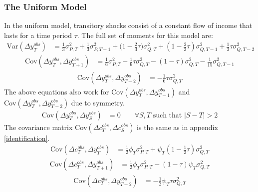 \subsubsection{The Uniform Model}
In the uniform model, transitory shocks consist of a constant flow of income that lasts for a time period $\tau$. The full set of moments for this model are:
\begin{align}
\mathrm{Var}(\Delta y^{obs}_T) &= \frac{1}{3}\sigma^2_{P,T} + \frac{1}{3}\sigma^2_{P,T-1} + \big(1-\frac{2}{3}\tau\big) \sigma^2_{Q,T}   +(1-\frac{2}{3}\tau) \sigma^2_{Q,T-1} + \frac{1}{3} \tau\sigma^2_{Q,T-2}
\end{align}
\begin{align}
\mathrm{Cov}(\Delta y^{obs}_T, \Delta y^{obs}_{T+1}) &= \frac{1}{6}\sigma^2_{P,T}  -\frac{1}{6}\tau \sigma^2_{Q,T}  -(1-\tau) \sigma^2_{Q,T}  -\frac{1}{15} \sigma^2_{Q,T-1}
\end{align}
\begin{align}
\mathrm{Cov}(\Delta y^{obs}_T, \Delta y^{obs}_{T+2})&= -\frac{1}{6}\tau \sigma^2_{Q,T}
\end{align}
The above equations also work for $\mathrm{Cov}(\Delta y^{obs}_T, \Delta y^{obs}_{T-1})$ and $\mathrm{Cov}(\Delta y^{obs}_T, \Delta y^{obs}_{T-2})$ due to symmetry.
\begin{align}
\mathrm{Cov}(\Delta y^{obs}_T, \Delta y^{obs}_{S}) &= 0 \qquad \forall S,T \text{ such that }|S-T| >2 
\end{align}
The covariance matrix $\mathrm{Cov}(\Delta c^{obs}_T, \Delta c^{obs}_{S})$ is the same as in appendix \ref{identification}.
\begin{align}
\mathrm{Cov}(\Delta c^{obs}_T, \Delta y^{obs}_T) &= \frac{1}{2} \phi_T \sigma^2_{P,T} + \psi_T  (1-\frac{1}{2}\tau )\sigma^2_{Q,T} 
\end{align}
\begin{align}
\mathrm{Cov}(\Delta c^{obs}_T, \Delta y^{obs}_{T+1})&= \frac{1}{2} \phi_T \sigma^2_{P,T} - (1-\tau) \psi_T \sigma^2_{Q,T} 
\end{align}
\begin{align}
\mathrm{Cov}(\Delta c^{obs}_T, \Delta y^{obs}_{T+2}) &= -\frac{1}{2}\psi_T  \tau \sigma^2_{Q,T}
\end{align}

